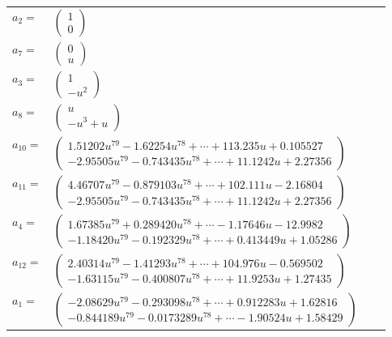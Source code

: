 \documentclass[1p]{elsarticle_modified}
\theoremstyle{definition}
\begin{document}
\begin{tabular}{m{7pt} m{180pt} m{7pt} m{180pt} }
\flushright $a_{2}=$&$\begin{pmatrix}1\\0\end{pmatrix}$ \\
\flushright $a_{7}=$&$\begin{pmatrix}0\\u\end{pmatrix}$ \\
\flushright $a_{3}=$&$\begin{pmatrix}1\\- u^2\end{pmatrix}$ \\
\flushright $a_{8}=$&$\begin{pmatrix}u\\- u^3+u\end{pmatrix}$ \\
\flushright $a_{10}=$&$\begin{pmatrix}1.51202 u^{79}-1.62254 u^{78}+\cdots+113.235 u+0.105527\\-2.95505 u^{79}-0.743435 u^{78}+\cdots+11.1242 u+2.27356\end{pmatrix}$ \\
\flushright $a_{11}=$&$\begin{pmatrix}4.46707 u^{79}-0.879103 u^{78}+\cdots+102.111 u-2.16804\\-2.95505 u^{79}-0.743435 u^{78}+\cdots+11.1242 u+2.27356\end{pmatrix}$ \\
\flushright $a_{4}=$&$\begin{pmatrix}1.67385 u^{79}+0.289420 u^{78}+\cdots-1.17646 u-12.9982\\-1.18420 u^{79}-0.192329 u^{78}+\cdots+0.413449 u+1.05286\end{pmatrix}$ \\
\flushright $a_{12}=$&$\begin{pmatrix}2.40314 u^{79}-1.41293 u^{78}+\cdots+104.976 u-0.569502\\-1.63115 u^{79}-0.400807 u^{78}+\cdots+11.9253 u+1.27435\end{pmatrix}$ \\
\flushright $a_{1}=$&$\begin{pmatrix}-2.08629 u^{79}-0.293098 u^{78}+\cdots+0.912283 u+1.62816\\-0.844189 u^{79}-0.0173289 u^{78}+\cdots-1.90524 u+1.58429\end{pmatrix}$ \\

\end{tabular}
\end{document}
